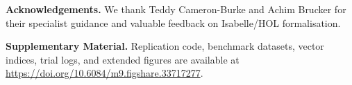 \documentclass{svproc}
\begin{document}
\medskip\noindent\textbf{Acknowledgements.} We thank Teddy Cameron-Burke and Achim Brucker for their specialist guidance and valuable feedback on Isabelle/HOL formalisation.

\medskip\noindent\textbf{Supplementary Material.} Replication code, benchmark datasets, vector indices, trial logs, and extended figures are available at \url{https://doi.org/10.6084/m9.figshare.33717277}.

\clearpage
\enlargethispage{2\baselineskip}


\end{document}
